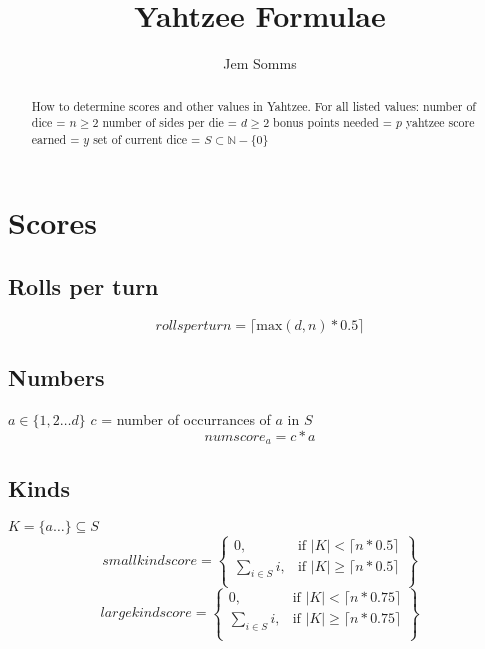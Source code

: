 \documentclass{article}
\begin{document}
\title{Yahtzee Formulae}
\author{Jem Somms}

\maketitle

\begin{abstract}
How to determine scores and other values in Yahtzee. \newline
For all listed values: \newline\newline
number of dice =  $n \geq 2$ \newline
number of sides per die = $d \geq 2$ \newline
bonus points needed = $p$ \newline
yahtzee score earned = $y$ \newline
set of current dice = $S \subset \mathbb{N} - \{0\}$ \newline
\end{abstract}

\section{Scores}
\subsection{Rolls per turn}
\begin{equation}
	rollsperturn = \lceil \text {max} (d, n) * 0.5 \rceil
\end{equation}
\subsection{Numbers}
$a \in \{1, 2 \dots d\}$\newline
$c$ = number of occurrances of $a$ in $S$ \newline
\begin{equation}
	numscore_a = c * a
\end{equation}

\subsection{Kinds}
$K = \{a \dots \} \subseteq S$
\begin{equation}
smallkindscore=
\left\{
    \begin{array}{lr}
    0, & \text{if } \lvert K \rvert < \lceil n * 0.5 \rceil\\
    \displaystyle\sum_{i \in S} i, & \text{if } \lvert K \rvert \geq \lceil n * 0.5 \rceil\\
    \end{array}
\right\}
\end{equation}
\begin{equation}
largekindscore=
\left\{
    \begin{array}{lr}
    0, & \text{if } \lvert K \rvert < \lceil n * 0.75 \rceil\\
    \displaystyle\sum_{i \in S} i, & \text{if } \lvert K \rvert \geq \lceil n * 0.75 \rceil\\
    \end{array}
\right\}
\end{equation}
\end{document}
